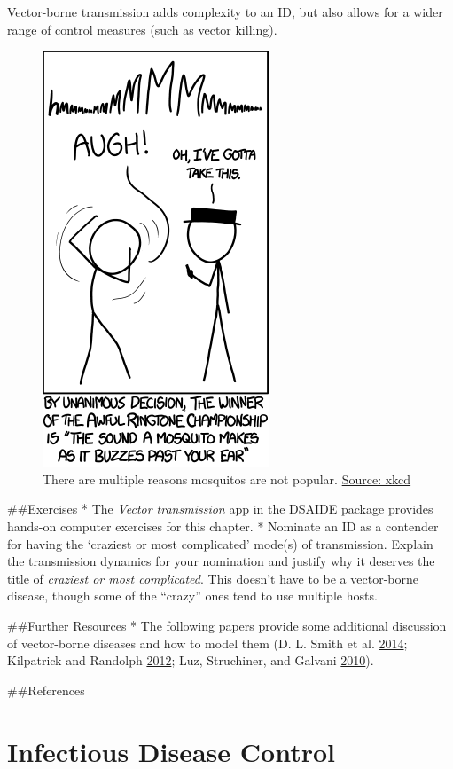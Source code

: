 \documentclass[]{book}
\theoremstyle{definition}
\theoremstyle{definition}
\theoremstyle{definition}
\theoremstyle{remark}
\begin{document}
Vector-borne transmission adds complexity to an ID, but also allows for
a wider range of control measures (such as vector killing).

\begin{figure}
\centering
\includegraphics{./images/xkcd-mosquito-ringtone.png}
\caption{There are multiple reasons mosquitos are not popular.
\href{https://xkcd.com/1241/}{Source: xkcd}}
\end{figure}

\#\#Exercises * The \emph{Vector transmission} app in the DSAIDE package
provides hands-on computer exercises for this chapter. * Nominate an ID
as a contender for having the `craziest or most complicated' mode(s) of
transmission. Explain the transmission dynamics for your nomination and
justify why it deserves the title of \emph{craziest or most
complicated}. This doesn't have to be a vector-borne disease, though
some of the ``crazy'' ones tend to use multiple hosts.

\#\#Further Resources * The following papers provide some additional
discussion of vector-borne diseases and how to model them (D. L. Smith
et al. \protect\hyperlink{ref-smith14}{2014}; Kilpatrick and Randolph
\protect\hyperlink{ref-kilpatrick12}{2012}; Luz, Struchiner, and Galvani
\protect\hyperlink{ref-luz10}{2010}).

\#\#References

\hypertarget{infectious-disease-control}{%
\chapter{Infectious Disease Control}\label{infectious-disease-control}}
\end{document}

